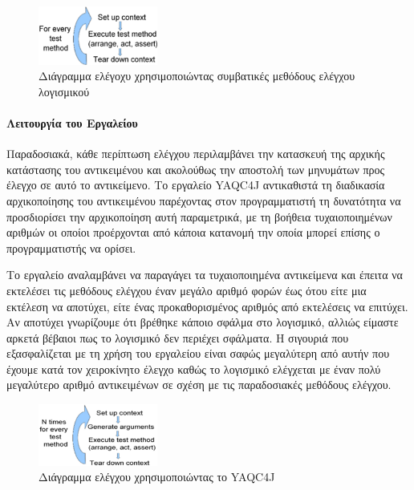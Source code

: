 \documentclass[12pt]{article}
\begin{document}
\begin{figure}
\centering
    \includegraphics[width=0.35\textwidth]{conventional_testing.png}
    \caption{Διάγραμμα ελέγοχυ χρησιμοποιώντας συμβατικές μεθόδους ελέγχου λογισμικού}
    \label{fig:conventional_testing}
\end{figure}

\paragraph{Λειτουργία του Εργαλείου}

Παραδοσιακά, κάθε περίπτωση ελέγχου περιλαμβάνει την κατασκευή της αρχικής κατάστασης του αντικειμένου και ακολούθως την αποστολή των μηνυμάτων προς έλεγχο σε αυτό το αντικείμενο. Το εργαλείο YAQC4J αντικαθιστά τη διαδικασία αρχικοποίησης του αντικειμένου παρέχοντας στον προγραμματιστή τη δυνατότητα να προσδιορίσει την αρχικοποίηση αυτή παραμετρικά, με τη βοήθεια τυχαιοποιημένων αριθμών οι οποίοι προέρχονται από κάποια κατανομή την οποία μπορεί επίσης ο προγραμματιστής να ορίσει.

\par Το εργαλείο αναλαμβάνει να παραγάγει τα τυχαιοποιημένα αντικείμενα και έπειτα να εκτελέσει τις μεθόδους ελέγχου έναν μεγάλο αριθμό φορών έως ότου είτε μια εκτέλεση να αποτύχει, είτε ένας προκαθορισμένος αριθμός από εκτελέσεις να επιτύχει. Αν αποτύχει γνωρίζουμε ότι βρέθηκε κάποιο σφάλμα στο λογισμικό, αλλιώς είμαστε αρκετά βέβαιοι πως το λογισμικό δεν περιέχει σφάλματα. Η σιγουριά που εξασφαλίζεται με τη χρήση του εργαλείου είναι σαφώς μεγαλύτερη από αυτήν που έχουμε κατά τον χειροκίνητο έλεγχο καθώς το λογισμικό ελέγχεται με έναν  πολύ μεγαλύτερο αριθμό αντικειμένων σε σχέση με τις παραδοσιακές μεθόδους ελέγχου.

\begin{figure}
\centering
    \includegraphics[width=0.35\textwidth]{testing_with_yaqc4j.png}
    \caption{Διάγραμμα ελέγχου χρησιμοποιώντας το YAQC4J}
    \label{fig:yaqc4j_testing}
\end{figure}
\end{document}
